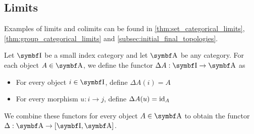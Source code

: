 \subsection{Limits}\label{subsec:categorical_limits}

\begin{remark}\label{def:categorical_limit_examples}
  Examples of limits and colimits can be found in \cref{thm:set_categorical_limits}, \cref{thm:group_categorical_limits} and \cref{subsec:initial_final_topologies}.
\end{remark}

\begin{definition}\label{def:diagonal_functor}\cite[143]{Leinster2014}
  Let \( \Bold I \) be a small index category and let \( \Bold A \) be any category. For each object \( A \in \Bold A \), we define the functor \( \Delta A: \Bold I \to \Bold A \) as
  \begin{itemize}
    \item For every object \( i \in \Bold I \), define \( \Delta A(i) = A \)
    \item For every morphism \( u: i \to j \), define \( \Delta A(u) = \operatorname{id}_A \)
  \end{itemize}

  We combine these functors for every object \( A \in \Bold A \) to obtain the functor \( \Delta: \Bold A \to [\Bold I, \Bold A] \).
\end{definition}

